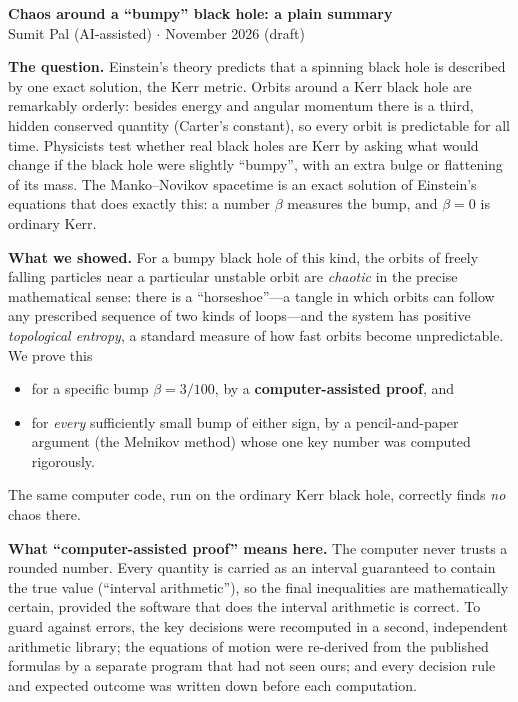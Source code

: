 \documentclass[11pt]{article}
\begin{document}
\begin{center}
{\Large\bfseries Chaos around a ``bumpy'' black hole: a plain summary}\\[0.4em]
Sumit Pal (AI-assisted) \quad$\cdot$ November 2026 (draft)
\end{center}

\textbf{The question.} Einstein's theory predicts that a spinning black hole is described by one exact solution, the
Kerr metric. Orbits around a Kerr black hole are remarkably orderly: besides energy and angular momentum there is a
third, hidden conserved quantity (Carter's constant), so every orbit is predictable for all time. Physicists test
whether real black holes are Kerr by asking what would change if the black hole were slightly ``bumpy'', with an
extra bulge or flattening of its mass. The Manko--Novikov spacetime is an exact solution of Einstein's equations
that does exactly this: a number $\beta$ measures the bump, and $\beta=0$ is ordinary Kerr.

\textbf{What we showed.} For a bumpy black hole of this kind, the orbits of freely falling particles near a
particular unstable orbit are \emph{chaotic} in the precise mathematical sense: there is a ``horseshoe''---a tangle
in which orbits can follow any prescribed sequence of two kinds of loops---and the system has positive
\emph{topological entropy}, a standard measure of how fast orbits become unpredictable. We prove this
\begin{itemize}
\item for a specific bump $\beta=3/100$, by a \textbf{computer-assisted proof}, and
\item for \emph{every} sufficiently small bump of either sign, by a pencil-and-paper argument (the Melnikov method)
whose one key number was computed rigorously.
\end{itemize}
The same computer code, run on the ordinary Kerr black hole, correctly finds \emph{no} chaos there.

\textbf{What ``computer-assisted proof'' means here.} The computer never trusts a rounded number. Every quantity is
carried as an interval guaranteed to contain the true value (``interval arithmetic''), so the final inequalities are
mathematically certain, provided the software that does the interval arithmetic is correct. To guard against errors,
the key decisions were recomputed in a second, independent arithmetic library; the equations of motion were
re-derived from the published formulas by a separate program that had not seen ours; and every decision rule and
expected outcome was written down before each computation.
\end{document}

